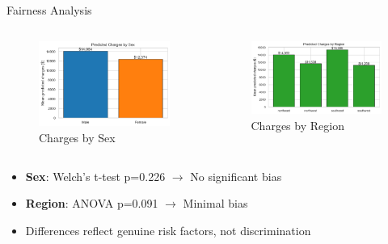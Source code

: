 \documentclass[10pt]{beamer}
\begin{document}
\begin{frame}{Fairness Analysis}
\begin{columns}
\begin{column}{0.5\textwidth}
\begin{figure}
\includegraphics[width=\textwidth]{fairness_mean_pred_by_sex.png}
\caption{Charges by Sex}
\end{figure}
\end{column}
\begin{column}{0.5\textwidth}
\begin{figure}
\includegraphics[width=\textwidth]{fairness_mean_pred_by_region.png}
\caption{Charges by Region}
\end{figure}
\end{column}
\end{columns}
\begin{itemize}
\item \textbf{Sex}: Welch's t-test p=0.226 $\rightarrow$ \textcolor{green}{\checkmark} No significant bias
\item \textbf{Region}: ANOVA p=0.091 $\rightarrow$ \textcolor{green}{\checkmark} Minimal bias
\item Differences reflect genuine risk factors, not discrimination
\end{itemize}
\end{frame}
\end{document}

